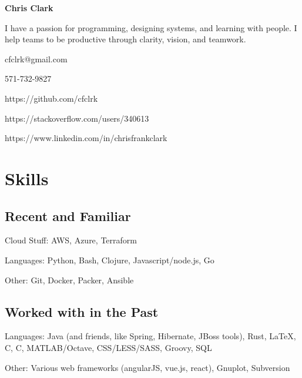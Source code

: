 \documentclass[12pt]{article}
\def\CC{{C\nolinebreak[4]\hspace{-.05em}\raisebox{.4ex}{\tiny\bf ++}}}
\begin{document}
\begin{center}
  {\sffamily\huge\textbf{Chris Clark}}
\end{center}


\begin{tcolorbox}[
    topbar,
    width=(\linewidth-2mm)/2,
    coltext=violet,
    fontupper=\itshape\bfseries\sffamily\large]
  I have a passion for programming, designing systems, and learning with people.
  I help teams to be productive through clarity, vision, and teamwork.
\end{tcolorbox}
\begin{tcolorbox}[topbar,width=(\linewidth-2mm)/2]
  cfclrk@gmail.com

  571-732-9827

  https://github.com/cfclrk

  https://stackoverflow.com/users/340613

  https://www.linkedin.com/in/chrisfrankclark
\end{tcolorbox}


\section*{Skills}

\begin{multicols}{2}
  \raggedright

  \subsection*{Recent and Familiar}

  Cloud Stuff: AWS, Azure, Terraform

  Languages: Python, Bash, Clojure, Javascript/node.js, Go

  Other: Git, Docker, Packer, Ansible

  \subsection*{Worked with in the Past}

  Languages: Java (and friends, like Spring, Hibernate, JBoss tools), Rust,
  \LaTeX, C, \CC, MATLAB/Octave, CSS/LESS/SASS, Groovy, SQL

  Other: Various web frameworks (angularJS, vue.js, react), Gnuplot,
  Subversion

  \vfill
  \columnbreak

\end{multicols}
\end{document}
